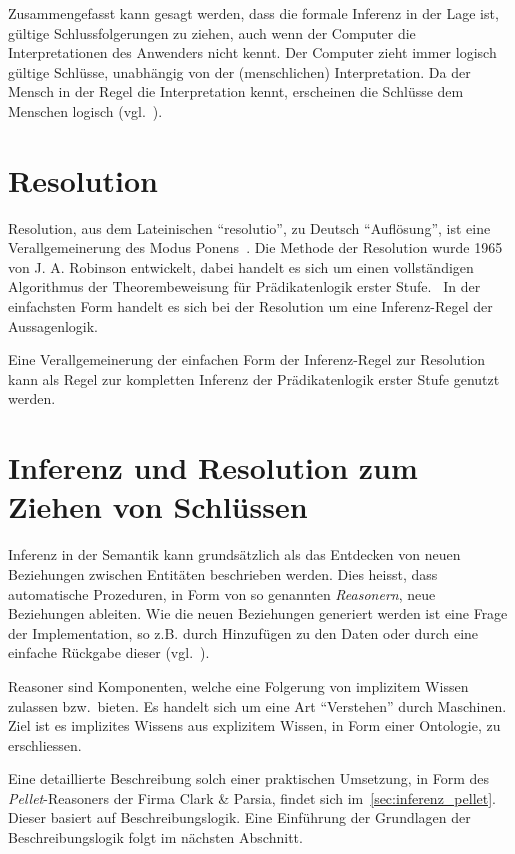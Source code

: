 Zusammengefasst kann gesagt werden, dass die formale Inferenz in der Lage ist, gültige Schlussfolgerungen zu ziehen, auch wenn der Computer die Interpretationen des Anwenders nicht kennt. Der Computer zieht immer logisch gültige Schlüsse, unabhängig von der (menschlichen) Interpretation. Da der Mensch in der Regel die Interpretation kennt, erscheinen die Schlüsse dem Menschen logisch (vgl.~\cite[S. 165]{russel}).

\section{Resolution}
\label{sec:resolution}

Resolution, aus dem Lateinischen ``resolutio'', zu Deutsch ``Auflösung'', ist eine Verallgemeinerung des Modus Ponens~\cite[S. 279]{russel}. Die Methode der Resolution wurde 1965 von J. A. Robinson entwickelt, dabei handelt es sich um einen vollständigen Algorithmus der Theorembeweisung für Prädikatenlogik erster Stufe.~\cite[S. 18]{russel} In der einfachsten Form handelt es sich bei der Resolution um eine Inferenz-Regel der Aussagenlogik.~\cite[S. 277]{russel}

Eine Verallgemeinerung der einfachen Form der Inferenz-Regel zur Resolution kann als Regel zur kompletten Inferenz der Prädikatenlogik erster Stufe genutzt werden.~\cite[S. 278]{russel}

\section{Inferenz und Resolution zum Ziehen von Schlüssen}
\label{sec:inferenz_praktisch}
Inferenz in der Semantik kann grundsätzlich als das Entdecken von neuen Beziehungen zwischen Entitäten beschrieben werden. Dies heisst, dass automatische Prozeduren, in Form von so genannten \textit{Reasonern}, neue Beziehungen ableiten. Wie die neuen Beziehungen generiert werden ist eine Frage der Implementation, so z.B. durch Hinzufügen zu den Daten oder durch eine einfache Rückgabe dieser (vgl.~\cite[Abschnitt 1]{w3inference}).

Reasoner sind Komponenten, welche eine Folgerung von implizitem Wissen zulassen bzw.\ bieten. Es handelt sich um eine Art ``Verstehen'' durch Maschinen. Ziel ist es implizites Wissens aus explizitem Wissen, in Form einer Ontologie, zu erschliessen.

Eine detaillierte Beschreibung solch einer praktischen Umsetzung, in Form des \textit{Pellet}-Reasoners der Firma Clark \& Parsia, findet sich im~\autoref{sec:inferenz_pellet}. Dieser basiert auf Beschreibungslogik.  Eine Einführung der Grundlagen der Beschreibungslogik folgt im nächsten Abschnitt.

